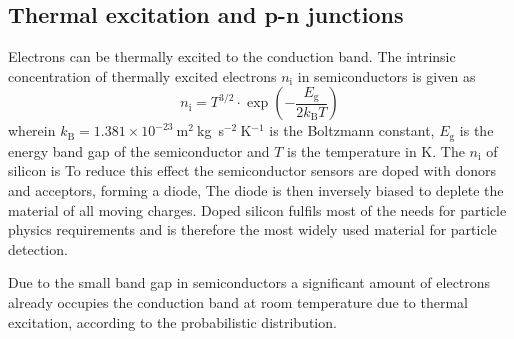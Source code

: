 


\subsection{Thermal excitation and p-n junctions}
Electrons can be thermally excited to the conduction band. The intrinsic concentration of thermally excited electrons $n_\mathrm{i}$ in semiconductors is given as
\begin{equation}
\label{eq:intrinsiccarrier}
n_\mathrm{i} = T^{3/2} \cdot \exp\left(-\frac{E_\mathrm{g}}{2k_\mathrm{B}T}\right)
\end{equation} 
wherein $k_\mathrm{B} = 1.381\times10^{-23}~$m$^2~$kg~s$^{-2}~$K$^{-1}$ is the Boltzmann constant, $E_\mathrm{g}$ is the energy band gap of the semiconductor and $T$ is the temperature in K. The $n_\mathrm{i}$ of silicon is 
To reduce this effect the semiconductor sensors are doped with donors and acceptors, forming a diode, The diode is then inversely biased to deplete the material of all moving charges. Doped silicon fulfils most of the needs for particle physics requirements and is therefore the most widely used material for particle detection.

Due to the small band gap in semiconductors a significant amount of electrons already occupies the conduction band at room temperature due to thermal excitation, according to the probabilistic distribution. 

